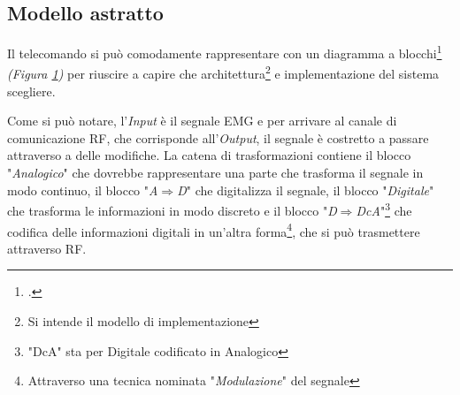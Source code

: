 \documentclass[a4paper, 10pt, final]{article} %
\newcommand{\InvisibleBorder}{
    (current bounding box.south west) ++($(-\fboxsep, -\fboxsep)-(0.5,0.5)$) coordinate (ll)
    (current bounding box.north east) ++($(\fboxsep, \fboxsep)+(0.5,0.5)$) coordinate (ur)
}
\begin{document}
    \subsection{Modello astratto}\label{sec:ProjectDesignAbstractModel}
    Il telecomando si pu\`{o} comodamente rappresentare con un diagramma a blocchi\footcite[]{BlockDiagram:Wiki} \emph{(Figura \ref{fig:BlockDiagram})} per riuscire a capire che architettura\footnote{Si intende il modello di implementazione} e implementazione del sistema scegliere.
    \begin{figure}[H]
        \centering
        \caption{}
        \label{fig:BlockDiagram}
    \end{figure}
    Come si pu\`{o} notare, l'\emph{Input} \`{e} il segnale EMG e per arrivare al canale di comunicazione RF, che corrisponde all'\emph{Output}, il segnale \`{e} costretto a passare attraverso a delle modifiche.
    La catena di trasformazioni contiene il blocco "\emph{Analogico}" che dovrebbe rappresentare una parte che trasforma il segnale in modo continuo, il blocco "\emph{A$\Rightarrow$D}" che digitalizza il segnale, il blocco "\emph{Digitale}" che trasforma le informazioni in modo discreto e il blocco "\emph{D$\Rightarrow$DcA}"\footnote{"DcA" sta per Digitale codificato in Analogico} che codifica delle informazioni digitali in un'altra forma\footnote{Attraverso una tecnica nominata "\emph{Modulazione}" \parencite[]{Modulation:Wiki} del segnale}, che si pu\`{o} trasmettere attraverso RF.
\end{document}
